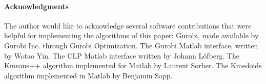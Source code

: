 \paragraph{Acknowledgments}
The author would like to acknowledge several software contributions that were helpful for implementing the algorithms of this paper: Gurobi, made available by Gurobi Inc. through Gurobi Optimization. The Gurobi Matlab interface, written by Wotao Yin. The CLP Matlab interface written by Johann L\"{o}fberg. The Kmeans++ algorithm implemented for Matlab by Laurent Sorber. The Kmedoids algorithm implemented in Matlab by Benjamin Sapp.
